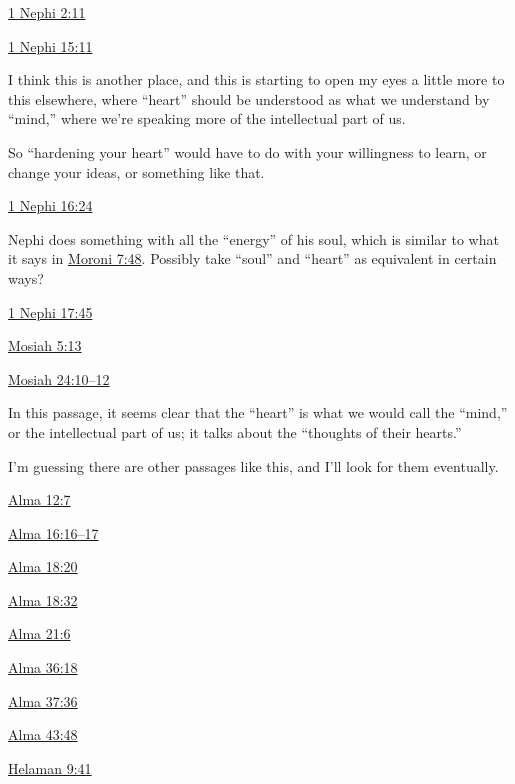 		\begin{compactdesc}
			\item[{\hyperref[1NEPHI-2-11]{1 Nephi 2:11}}]
			\item[{\hyperref[1NEPHI-15-11]{1 Nephi 15:11}}] \phantom{.}
				\begin{compactitem}
					\item I think this is another place, and this is starting to open my eyes a little more to this elsewhere, where ``heart'' should be understood as what we understand by ``mind,'' where we're speaking more of the intellectual part of us.
					\item So ``hardening your heart'' would have to do with your willingness to learn, or change your ideas, or something like that.
				\end{compactitem}
			\item[{\hyperref[1NEPHI-16-24]{1 Nephi 16:24}}] \phantom{.}
				\begin{compactitem}
					\item Nephi does something with all the ``energy'' of his soul, which is similar to what it says in \hyperref[MORONI-7-48]{Moroni 7:48}. Possibly take ``soul'' and ``heart'' as equivalent in certain ways?
				\end{compactitem}
			\item[{\hyperref[1NEPHI-17-45]{1 Nephi 17:45}}]
			\item[{\hyperref[MOSIAH-5-13]{Mosiah 5:13}}]
			\item[{\hyperref[MOSIAH-24-10]{Mosiah 24:10--12}}] \phantom{.}
				\begin{compactitem}
					\item In this passage, it seems clear that the ``heart'' is what we would call the ``mind,'' or the intellectual part of us; it talks about the ``thoughts of their hearts.''
					\item I'm guessing there are other passages like this, and I'll look for them eventually.
				\end{compactitem}
			\item[{\hyperref[ALMA-12-7]{Alma 12:7}}]
			\item[{\hyperref[ALMA-16-16]{Alma 16:16--17}}]
			\item[{\hyperref[ALMA-18-20]{Alma 18:20}}]
			\item[{\hyperref[ALMA-18-32]{Alma 18:32}}]
			\item[{\hyperref[ALMA-21-6]{Alma 21:6}}]
			\item[{\hyperref[ALMA-36-18]{Alma 36:18}}]
			\item[{\hyperref[ALMA-37-36]{Alma 37:36}}]
			\item[{\hyperref[ALMA-43-48]{Alma 43:48}}]
			\item[{\hyperref[HELAMAN-9-41]{Helaman 9:41}}]
		\end{compactdesc}
		

